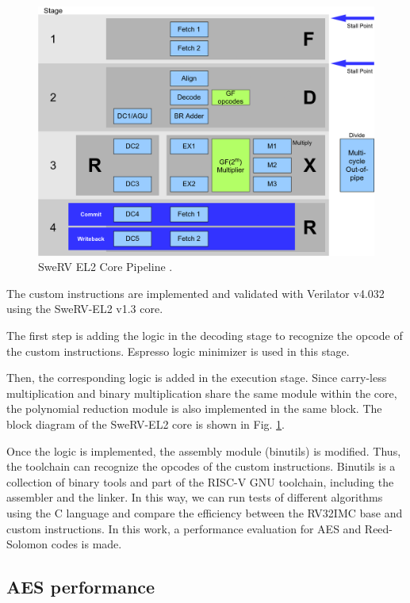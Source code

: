 \begin{figure}[b]
    \centering
    \includegraphics[width=0.95\linewidth]{img/swerv.png}
    \caption{SweRV EL2 Core Pipeline \cite{swervel2}.}
    \label{fig:swerv}
\end{figure}

The custom instructions are implemented and validated with Verilator v4.032 using the SweRV-EL2 v1.3 core.

The first step is adding the logic in the decoding stage to recognize the opcode of the custom instructions. 
Espresso logic minimizer \cite{250190} is used in this stage.

Then, the corresponding logic is added in the execution stage. Since carry-less multiplication and binary 
multiplication share the same module within the core, the polynomial reduction module is also implemented 
in the same block. The block diagram of the SweRV-EL2 core is shown in Fig. \ref{fig:swerv}.

Once the logic is implemented, the assembly module (binutils) is modified. Thus, the toolchain can recognize 
the opcodes of the custom instructions. Binutils is a collection of 
binary tools and part of the RISC-V GNU toolchain, including the assembler and the linker.
In this way, we can run tests of different algorithms using the C language and compare the efficiency between the RV32IMC base and custom instructions. 
In this work, a performance evaluation for AES and Reed-Solomon codes is made.

\subsection{AES performance} 

